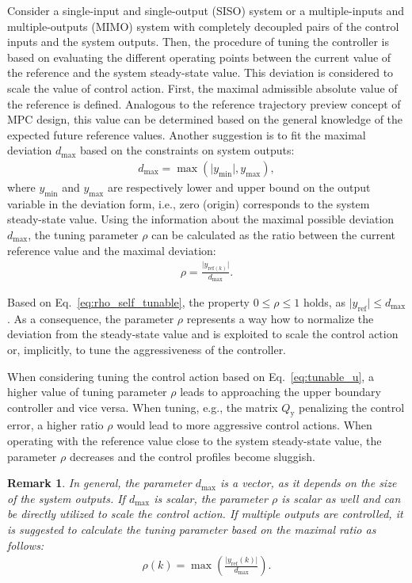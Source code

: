 \documentclass[preprint,12pt]{elsarticle}
\newtheorem{remark}[theorem]{Remark}
\begin{document}
	Consider a single-input and single-output (SISO) system or a multiple-inputs and multiple-outputs (MIMO) system with completely decoupled pairs of the control inputs and the system outputs. 
	Then, the procedure of tuning the controller is based on evaluating the different operating points between the current value of the reference and the system steady-state value. This deviation is considered to scale the value of control action. First, the maximal admissible absolute value of the reference is defined. Analogous to the reference trajectory preview concept of MPC design, this value can be determined based on the general knowledge of the expected future reference values. Another suggestion is to fit the maximal deviation $d_{\max}$ based on the constraints on system outputs: 
	\begin{eqnarray}
		\label{eq:d_max}
		d_{\max} = \max(\vert y_{\min} \vert, y_{\max}),
	\end{eqnarray}
	where $y_{\min}$ and $y_{\max}$ are respectively lower and upper bound on the output variable in the deviation form, i.e., zero (origin) corresponds to the system steady-state value. Using the information about the maximal possible deviation $d_{\max}$, the tuning parameter $\rho$ can be calculated as the ratio between the current reference value and the maximal deviation:  
	\begin{eqnarray}
		\label{eq:rho_self_tunable}
		\rho = \frac{\vert y_{\mathrm{ref}(k)} \vert}{d_{\max}}.
	\end{eqnarray}
	
	Based on Eq.~\eqref{eq:rho_self_tunable}, the property $0 \le \rho \le 1$ holds, as $\vert y_{\mathrm{ref}} \vert \le d_{\max}$. As a consequence, the parameter $\rho$ represents a way how to normalize the deviation from the steady-state value and is exploited to scale the control action or, implicitly, to tune the aggressiveness of the controller. 
	
	When considering tuning the control action based on Eq.~\eqref{eq:tunable_u}, a higher value of tuning parameter $\rho$ leads to approaching the upper boundary controller and vice versa. When tuning, e.g., the matrix $Q_\mathrm{y}$ penalizing the control error, a higher ratio $\rho$ would lead to more aggressive control actions. When operating with the reference value close to the system steady-state value, the parameter $\rho$ decreases and the control profiles become sluggish.
	
	\begin{remark}
		In general, the parameter $d_{\max}$ is a vector, as it depends on the size of the system outputs. If $d_{\max}$ is scalar, the parameter $\rho$ is scalar as well and can be directly utilized to scale the control action. If multiple outputs are controlled, it is suggested to calculate the tuning parameter based on the maximal ratio as follows:
		\begin{eqnarray}
			\label{eq:rho_max}
			\rho(k) = \max \left( \frac{\vert y_{\mathrm{ref}}(k) \vert}{d_{\max}} \right).
		\end{eqnarray}
	\end{remark}
	
\end{document}
